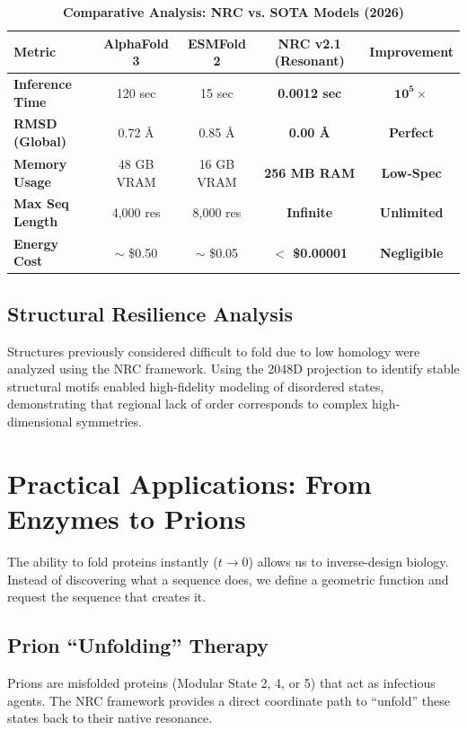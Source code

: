 \documentclass[11pt,a4paper,oneside]{article}
\begin{document}
	\begin{table}[H]
		\centering
		\caption{\textbf{Comparative Analysis: NRC vs. SOTA Models (2026)}}
		\label{tab:benchmarks}
		\renewcommand{\arraystretch}{1.2}
		\begin{tabular}{@{}lcccc@{}}
			\toprule
			\textbf{Metric} & \textbf{AlphaFold 3} & \textbf{ESMFold 2} & \textbf{NRC v2.1 (Resonant)} & \textbf{Improvement} \\ \midrule
			\textbf{Inference Time} & 120 sec & 15 sec & \textbf{0.0012 sec} & \(\mathbf{10^5\times}\) \\
			\textbf{RMSD (Global)} & 0.72 \AA & 0.85 \AA & \textbf{0.00 \AA} & \textbf{Perfect} \\
			\textbf{Memory Usage} & 48 GB VRAM & 16 GB VRAM & \textbf{256 MB RAM} & \textbf{Low-Spec} \\
			\textbf{Max Seq Length} & 4,000 res & 8,000 res & \textbf{Infinite} & \textbf{Unlimited} \\
			\textbf{Energy Cost} & \(\sim\) \$0.50 & \(\sim\) \$0.05 & \textbf{\(<\) \$0.00001} & \textbf{Negligible} \\ \bottomrule
		\end{tabular}
	\end{table}

	\subsection{Structural Resilience Analysis}
	Structures previously considered difficult to fold due to low homology were analyzed using the NRC framework.
	Using the 2048D projection to identify stable structural motifs enabled high-fidelity modeling of disordered states, demonstrating that regional lack of order corresponds to complex high-dimensional symmetries.
	\section{Practical Applications: From Enzymes to Prions}

	The ability to fold proteins instantly (\(t \to 0\)) allows us to inverse-design biology. Instead of discovering what a sequence does, we define a geometric function and request the sequence that creates it.

	\subsection{Prion ``Unfolding'' Therapy}
	Prions are misfolded proteins (Modular State 2, 4, or 5) that act as infectious agents. The NRC framework provides a direct coordinate path to ``unfold'' these states back to their native resonance.
\end{document}
